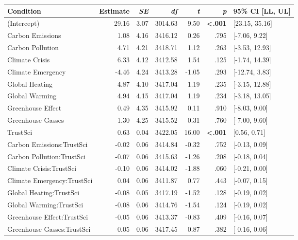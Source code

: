 \begin{table}[ht]
\centering
\begin{tabular}{lrrrrrl}
  \hline
Condition & Estimate & \textit{SE} & \textit{df} & \textit{t} & \textit{p} & 95\% CI [LL, UL] \\ 
  \hline
(Intercept) & 29.16 & 3.07 & 3014.63 & 9.50 & \textbf{\textless  .001} & [23.15, 35.16] \\ 
  Carbon Emissions & 1.08 & 4.16 & 3416.12 & 0.26 & .795 & [-7.06, 9.22] \\ 
  Carbon Pollution & 4.71 & 4.21 & 3418.71 & 1.12 & .263 & [-3.53, 12.93] \\ 
  Climate Crisis & 6.33 & 4.12 & 3412.58 & 1.54 & .125 & [-1.74, 14.39] \\ 
  Climate Emergency & -4.46 & 4.24 & 3413.28 & -1.05 & .293 & [-12.74, 3.83] \\ 
  Global Heating & 4.87 & 4.10 & 3417.04 & 1.19 & .235 & [-3.15, 12.88] \\ 
  Global Warming & 4.94 & 4.15 & 3417.04 & 1.19 & .234 & [-3.18, 13.05] \\ 
  Greenhouse Effect & 0.49 & 4.35 & 3415.92 & 0.11 & .910 & [-8.03, 9.00] \\ 
  Greenhouse Gasses & 1.30 & 4.25 & 3415.52 & 0.31 & .760 & [-7.00, 9.60] \\ 
  TrustSci & 0.63 & 0.04 & 3422.05 & 16.00 & \textbf{\textless  .001} & [0.56, 0.71] \\ 
  Carbon Emissions:TrustSci & -0.02 & 0.06 & 3414.84 & -0.32 & .752 & [-0.13, 0.09] \\ 
  Carbon Pollution:TrustSci & -0.07 & 0.06 & 3415.63 & -1.26 & .208 & [-0.18, 0.04] \\ 
  Climate Crisis:TrustSci & -0.10 & 0.06 & 3414.02 & -1.88 & .060 & [-0.21, 0.00] \\ 
  Climate Emergency:TrustSci & 0.04 & 0.06 & 3411.87 & 0.77 & .443 & [-0.07, 0.15] \\ 
  Global Heating:TrustSci & -0.08 & 0.05 & 3417.19 & -1.52 & .128 & [-0.19, 0.02] \\ 
  Global Warming:TrustSci & -0.08 & 0.06 & 3414.76 & -1.54 & .124 & [-0.19, 0.02] \\ 
  Greenhouse Effect:TrustSci & -0.05 & 0.06 & 3413.37 & -0.83 & .409 & [-0.16, 0.07] \\ 
  Greenhouse Gasses:TrustSci & -0.05 & 0.06 & 3417.45 & -0.87 & .382 & [-0.16, 0.06] \\ 
   \hline
\end{tabular}
\end{table}
